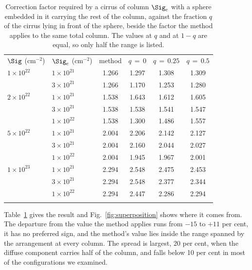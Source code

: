 \begin{table}
\caption{Correction factor required by a cirrus of column $\Sig_{\rm c}$ with a sphere embedded in it carrying the rest of the
column, against the fraction $q$ of the cirrus lying in front of the sphere, beside the factor the method applies to the same
total column. The values at $q$ and at $1-q$ are equal, so only half the range is listed.}
\label{tab:arrange}
\centering
\begin{tabular}{llcccc}
\hline\hline
\noalign{\smallskip}
$\Sig$ (cm$^{-2}$) & $\Sig_{\rm c}$ (cm$^{-2}$) & method & $q\,{=}\,0$ & $q\,{=}\,0.25$ & $q\,{=}\,0.5$ \\
\noalign{\smallskip}
\hline
\noalign{\smallskip}
$1{\times}10^{22}$ & $1{\times}10^{21}$ & 1.266 & 1.297 & 1.308 & 1.309 \\
                   & $3{\times}10^{21}$ & 1.266 & 1.170 & 1.253 & 1.280 \\
$2{\times}10^{22}$ & $1{\times}10^{21}$ & 1.538 & 1.643 & 1.612 & 1.605 \\
                   & $3{\times}10^{21}$ & 1.538 & 1.538 & 1.541 & 1.547 \\
                   & $1{\times}10^{22}$ & 1.538 & 1.300 & 1.486 & 1.557 \\
$5{\times}10^{22}$ & $1{\times}10^{21}$ & 2.004 & 2.206 & 2.142 & 2.127 \\
                   & $3{\times}10^{21}$ & 2.004 & 2.160 & 2.044 & 2.027 \\
                   & $1{\times}10^{22}$ & 2.004 & 1.945 & 1.967 & 2.001 \\
$1{\times}10^{23}$ & $1{\times}10^{21}$ & 2.294 & 2.548 & 2.475 & 2.453 \\
                   & $3{\times}10^{21}$ & 2.294 & 2.548 & 2.377 & 2.344 \\
                   & $1{\times}10^{22}$ & 2.294 & 2.447 & 2.286 & 2.294 \\
\noalign{\smallskip}
\hline
\end{tabular}
\end{table}

Table~\ref{tab:arrange} gives the result and Fig.~\ref{fig:superposition} shows where it comes from. The departure from the value
the method applies runs from $-15$ to $+11$ per cent, it has no preferred sign, and the method's value lies inside the range
spanned by the arrangement at every column. The spread is largest, 20 per cent, when the diffuse component carries half of the
column, and falls below 10 per cent in most of the configurations we examined.

